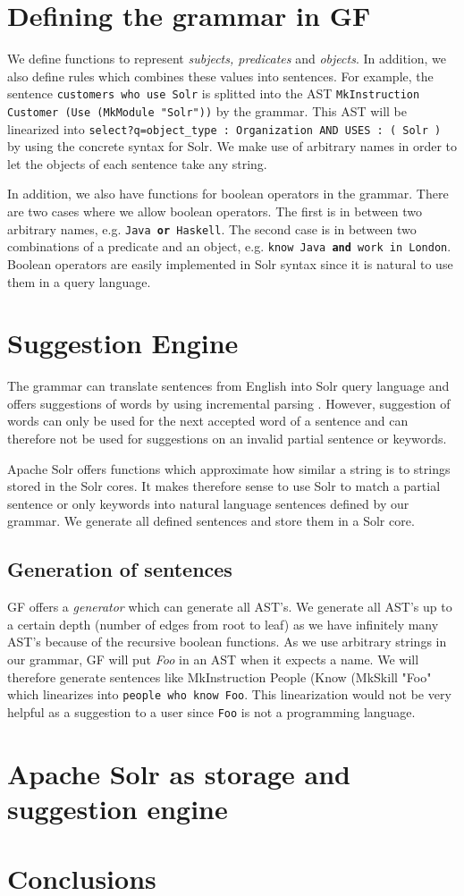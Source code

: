 \documentclass[10pt, a4paper]{article}
\begin{document}
\section{Defining the grammar in GF}
We define functions to represent \emph{subjects, predicates} and \emph{objects}. In addition, we also define rules which combines these values into sentences. For example, the sentence \texttt{customers who use Solr} is splitted into the AST \texttt{MkInstruction Customer (Use (MkModule "Solr"))} by the grammar. This AST will be linearized into \texttt{select?q=object\_type : Organization AND USES : ( Solr )} by using the concrete syntax for Solr. We make use of arbitrary names in order to let the objects of each sentence take any string.

In addition, we also have functions for boolean operators in the grammar. There are two cases where we allow boolean operators. The first is in between two arbitrary names, e.g. \texttt{Java \textbf{or} Haskell}. The second case is in between two combinations of a predicate and an object, e.g. \texttt{know Java \textbf{and} work in London}. Boolean operators are easily implemented in Solr syntax since it is natural to use them in a query language.

\section{Suggestion Engine}
The grammar can translate sentences from English into Solr query language and offers suggestions of words by using incremental parsing \cite{krasimir}. However, suggestion of words can only be used for the next accepted word of a sentence and can therefore not be used for suggestions on an invalid partial sentence or keywords.

Apache Solr offers functions which approximate how similar a string is to strings stored in the Solr cores. It makes therefore sense to use Solr to match a partial sentence or only keywords into natural language sentences defined by our grammar. We generate all defined sentences and store them in a Solr core.

\subsection{Generation of sentences}
GF offers a \emph{generator} which can generate all AST's. We generate all AST's up to a certain depth (number of edges from root to leaf) as we have infinitely many AST's because of the recursive boolean functions. As we use arbitrary strings in our grammar, GF will put \emph{Foo} in an AST when it expects a name. We will therefore generate sentences like MkInstruction People (Know (MkSkill "Foo" which linearizes into \texttt{people who know Foo}. This linearization would not be very helpful as a suggestion to a user since \texttt{Foo} is not a programming language.  
\section{Apache Solr as storage and suggestion engine}

\section{Conclusions}


% 


\end{document}
